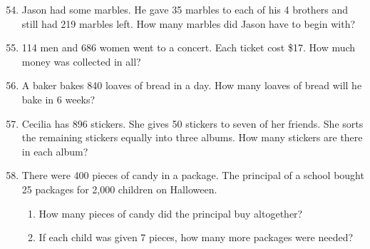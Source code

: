 \documentclass[11pt, a4paper]{article}
\begin{document}
\begin{enumerate}[label=\arabic*.]
    \setcounter{enumi}{53}
    \item Jason had some marbles. He gave 35 marbles to each of his 4 brothers and still had 219 marbles left. How many marbles did Jason have to begin with?

    \vspace{6cm}

    \item 114 men and 686 women went to a concert. Each ticket cost \$17. How much money was collected in all?

    \vspace{6cm}

    \item A baker bakes 840 loaves of bread in a day. How many loaves of bread will he bake in 6 weeks?

\end{enumerate}

\pagebreak

\begin{enumerate}[label=\arabic*.]
    \setcounter{enumi}{56}
    \item Cecilia has 896 stickers. She gives 50 stickers to seven of her friends. She sorts the remaining stickers equally into three albums. How many stickers are there in each album?

    \vspace{8cm}

    \item There were 400 pieces of candy in a package. The principal of a school bought 25 packages for 2,000 children on Halloween.
    
    \begin{enumerate}[label=(\alph*), leftmargin=*]
        \item How many pieces of candy did the principal buy altogether?
        \item If each child was given 7 pieces, how many more packages were needed?
    \end{enumerate}

\end{enumerate}

\pagebreak
\end{document}
